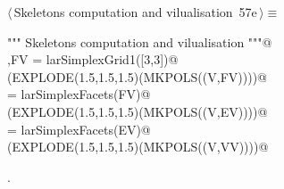 \documentclass[11pt,oneside]{article}    %
\begin{document}
\begin{flushleft} \small \label{scrap109}
\protect{}$\langle\,$Skeletons computation and vilualisation\nobreak\ {\footnotesize 57e}$\,\rangle\equiv$
\vspace{-1ex}
\begin{list}{}{} \item
\mbox{}\verb@""" Skeletons computation and vilualisation """@\\
\mbox{}\verb@V,FV = larSimplexGrid1([3,3])@\\
\mbox{}\verb@VIEW(EXPLODE(1.5,1.5,1.5)(MKPOLS((V,FV))))@\\
\mbox{}\verb@EV = larSimplexFacets(FV)@\\
\mbox{}\verb@VIEW(EXPLODE(1.5,1.5,1.5)(MKPOLS((V,EV))))@\\
\mbox{}\verb@VV = larSimplexFacets(EV)@\\
\mbox{}\verb@VIEW(EXPLODE(1.5,1.5,1.5)(MKPOLS((V,VV))))@\\
\mbox{}\verb@@{\NWsep}
\end{list}
\vspace{-1ex}
\footnotesize\addtolength{\baselineskip}{-1ex}
\begin{list}{}{\setlength{\itemsep}{-\parsep}\setlength{\itemindent}{-\leftmargin}}
\item {\NWtxtMacroNoRef}.
\end{list}
\end{flushleft}
\end{document}
